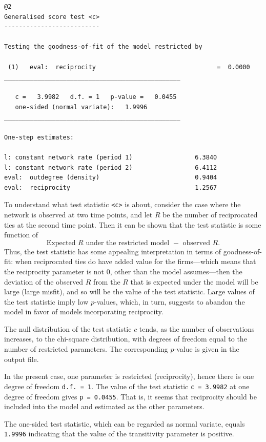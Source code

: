 \documentclass[a4paper,fleqn,11pt]{article}
\newcommand{\+}{\, + \,}
\begin{document}
{\footnotesize
\begin{verbatim}
@2
Generalised score test <c>
--------------------------

Testing the goodness-of-fit of the model restricted by

 (1)   eval:  reciprocity                                 =  0.0000
________________________________________________

   c =   3.9982   d.f. = 1   p-value =   0.0455
   one-sided (normal variate):   1.9996
________________________________________________

One-step estimates:

l: constant network rate (period 1)                 6.3840
l: constant network rate (period 2)                 6.4112
eval:  outdegree (density)                          0.9404
eval:  reciprocity                                  1.2567
\end{verbatim}
}
To understand what test statistic {\tt <c>} is about, consider the case
where the network is observed at two time points, and let $R$
be the number of reciprocated ties at the second time point. Then it
can be shown that the test statistic is some function of
\[
  \mbox{Expected $R$ under the restricted model } - \mbox{ observed } R.
\]
Thus, the test statistic has some appealing interpretation in terms
of goodness-of-fit: when reciprocated ties do have added value for
the firms---which means that the reciprocity parameter is not 0,
other than the model assumes---then the deviation of the observed
$R$ from the $R$ that is expected under the model will be large
(large misfit), and so will be the value of the test statistic.
Large values of the test statistic imply low $p$-values, which, in
turn, suggests to abandon the model in favor of models incorporating
reciprocity.

The null distribution of the test statistic $c$ tends,
as the number of observations increases, to the chi-square
distribution, with degrees of freedom equal to the
number of restricted parameters. The corresponding $p$-value is
given in the output file.

In the present case, one parameter is restricted (reciprocity),
hence there is one degree of freedom {\tt d.f.\ = 1}. The value of
the test statistic {\tt c = 3.9982} at one degree of freedom
gives {\tt p = 0.0455}.
That is, it seems that reciprocity
should be included into the model and estimated as the other
parameters.

The one-sided test statistic, which can be regarded as normal variate, equals {\tt 1.9996}
indicating that the value of the transitivity parameter is positive.
\end{document}
